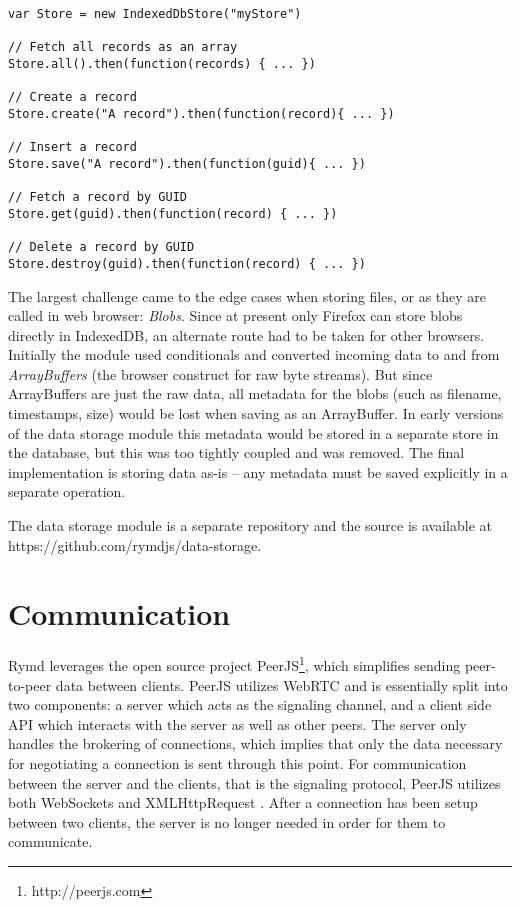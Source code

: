 \begin{Code}
\begin{lstlisting}[caption={Common database operations}, label={lst:api}]
var Store = new IndexedDbStore("myStore")

// Fetch all records as an array
Store.all().then(function(records) { ... })

// Create a record
Store.create("A record").then(function(record){ ... })

// Insert a record
Store.save("A record").then(function(guid){ ... })

// Fetch a record by GUID
Store.get(guid).then(function(record) { ... })

// Delete a record by GUID
Store.destroy(guid).then(function(record) { ... })
\end{lstlisting}
\end{Code}

The largest challenge came to the edge cases when storing files, or as they are called in web browser: \emph{Blobs}. Since at present only Firefox can store blobs directly in IndexedDB, an alternate route had to be taken for other browsers. Initially the module used conditionals and converted incoming data to and from \emph{ArrayBuffers} (the browser construct for raw byte streams). But since ArrayBuffers are just the raw data, all metadata for the blobs (such as filename, timestamps, size) would be lost when saving as an ArrayBuffer. In early versions of the data storage module this metadata would be stored in a separate store in the database, but this was too tightly coupled and was removed. The final implementation is storing data as-is – any metadata must be saved explicitly in a separate operation.


The data storage module is a separate repository and the source is available at https://github.com/rymdjs/data-storage.

\section{Communication}
\label{sec:p2p}

Rymd leverages the open source project PeerJS\footnote{http://peerjs.com}, which simplifies sending peer-to-peer data between clients. PeerJS utilizes WebRTC and is essentially split into two components: a server which acts as the signaling channel, and a client side API which interacts with the server as well as other peers. The server only handles the brokering of connections, which implies that only the data necessary for negotiating a connection is sent through this point. For communication between the server and the clients, that is the signaling protocol, PeerJS utilizes both WebSockets and XMLHttpRequest \cite{PeerjsGithub:2014:Online}. After a connection has been setup between two clients, the server is no longer needed in order for them to communicate.

